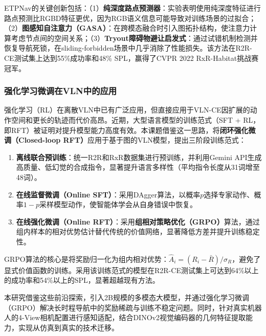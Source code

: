 ETPNav的关键创新包括：（1）\textbf{纯深度路点预测器}：实验表明使用纯深度特征进行路点预测比RGBD特征更优，因为RGB语义信息可能导致对训练场景的过拟合；（2）\textbf{图感知自注意力（GASA）}：在跨模态融合时引入图拓扑结构，使注意力计算考虑节点间的空间关系；（3）\textbf{Tryout障碍物避让启发式}：通过试错机制检测并恢复导航死锁，在sliding-forbidden场景中几乎消除了性能损失。该方法在R2R-CE测试集上达到55\%成功率和48\% SPL，赢得了CVPR 2022 RxR-Habitat挑战赛冠军。

\subsubsection{强化学习微调在VLN中的应用}
强化学习（RL）在离散VLN中已有广泛应用，但直接应用于VLN-CE因扩展的动作空间和更长的轨迹而代价高昂。近期，大型语言模型的训练范式（SFT + RL，即RFT）被证明对提升模型能力高度有效。本课题借鉴这一思路，将\textbf{闭环强化微调（Closed-loop RFT）}应用于基于图的VLN模型，提出三阶段训练范式：

\begin{enumerate}
    \item \textbf{离线联合预训练}：统一R2R和RxR数据集进行预训练，并利用Gemini API生成高质量、低幻觉的合成指令，显著提升语言多样性（平均指令长度从31词增至48词）。
    \item \textbf{在线监督微调（Online SFT）}：采用DAgger算法，以概率$p$选择专家动作、概率$1-p$采样模型动作，使智能体学会从自身错误中恢复。
    \item \textbf{在线强化微调（Online RFT）}：采用\textbf{组相对策略优化（GRPO）}\cite{deepseek_r1}算法，通过组内样本的相对优势估计替代传统的价值网络，显著降低方差并提升训练稳定性。
\end{enumerate}

GRPO算法的核心是将奖励归一化为组内相对优势：$\hat{A}_i = (R_i - \bar{R}) / \sigma_R$，避免了显式价值函数的训练。采用该训练范式的模型在R2R-CE测试集上可达到64\%以上的成功率和54\%以上的SPL，显著超越现有方法。

本研究借鉴这些前沿探索，引入2B规模的多模态大模型，并通过强化学习微调（GRPO\cite{deepseek_r1}）解决长时程导航中的奖励稀疏与训练不稳定问题。同时，针对真实机器人的4-View相机配置进行感知适配，结合DINOv2\cite{dinov2}视觉编码器的几何特征提取能力，实现从仿真到真实的技术迁移。

